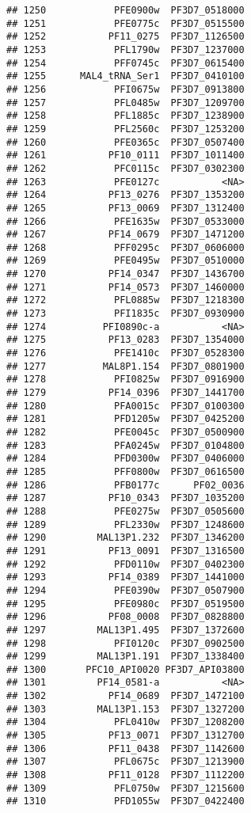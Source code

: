 \documentclass[12pt, a4paper]{article}\usepackage[]{graphicx}\usepackage[]{color}
\makeatletter
\newenvironment{kframe}{%
 \def\at@end@of@kframe{}%
 \ifinner\ifhmode%
  \def\at@end@of@kframe{\end{minipage}}%
  \begin{minipage}{\columnwidth}%
 \fi\fi%
 \def\FrameCommand##1{\hskip\@totalleftmargin \hskip-\fboxsep
 \colorbox{shadecolor}{##1}\hskip-\fboxsep
     \hskip-\linewidth \hskip-\@totalleftmargin \hskip\columnwidth}%
 \MakeFramed {\advance\hsize-\width
   \@totalleftmargin\z@ \linewidth\hsize
   \@setminipage}}%
 {\par\unskip\endMakeFramed%
 \at@end@of@kframe}
\newenvironment{knitrout}{}{} %
\makeatother
\begin{document}
\begin{knitrout}
\begin{kframe}
\begin{verbatim}
## 1250            PFE0900w  PF3D7_0518000
## 1251            PFE0775c  PF3D7_0515500
## 1252           PF11_0275  PF3D7_1126500
## 1253            PFL1790w  PF3D7_1237000
## 1254            PFF0745c  PF3D7_0615400
## 1255      MAL4_tRNA_Ser1  PF3D7_0410100
## 1256            PFI0675w  PF3D7_0913800
## 1257            PFL0485w  PF3D7_1209700
## 1258            PFL1885c  PF3D7_1238900
## 1259            PFL2560c  PF3D7_1253200
## 1260            PFE0365c  PF3D7_0507400
## 1261           PF10_0111  PF3D7_1011400
## 1262            PFC0115c  PF3D7_0302300
## 1263            PFE0127c           <NA>
## 1264           PF13_0276  PF3D7_1353200
## 1265           PF13_0069  PF3D7_1312400
## 1266            PFE1635w  PF3D7_0533000
## 1267           PF14_0679  PF3D7_1471200
## 1268            PFF0295c  PF3D7_0606000
## 1269            PFE0495w  PF3D7_0510000
## 1270           PF14_0347  PF3D7_1436700
## 1271           PF14_0573  PF3D7_1460000
## 1272            PFL0885w  PF3D7_1218300
## 1273            PFI1835c  PF3D7_0930900
## 1274          PFI0890c-a           <NA>
## 1275           PF13_0283  PF3D7_1354000
## 1276            PFE1410c  PF3D7_0528300
## 1277          MAL8P1.154  PF3D7_0801900
## 1278            PFI0825w  PF3D7_0916900
## 1279           PF14_0396  PF3D7_1441700
## 1280            PFA0015c  PF3D7_0100300
## 1281            PFD1205w  PF3D7_0425200
## 1282            PFE0045c  PF3D7_0500900
## 1283            PFA0245w  PF3D7_0104800
## 1284            PFD0300w  PF3D7_0406000
## 1285            PFF0800w  PF3D7_0616500
## 1286            PFB0177c      PF02_0036
## 1287           PF10_0343  PF3D7_1035200
## 1288            PFE0275w  PF3D7_0505600
## 1289            PFL2330w  PF3D7_1248600
## 1290         MAL13P1.232  PF3D7_1346200
## 1291           PF13_0091  PF3D7_1316500
## 1292            PFD0110w  PF3D7_0402300
## 1293           PF14_0389  PF3D7_1441000
## 1294            PFE0390w  PF3D7_0507900
## 1295            PFE0980c  PF3D7_0519500
## 1296           PF08_0008  PF3D7_0828800
## 1297         MAL13P1.495  PF3D7_1372600
## 1298            PFI0120c  PF3D7_0902500
## 1299         MAL13P1.191  PF3D7_1338400
## 1300       PFC10_API0020 PF3D7_API03800
## 1301         PF14_0581-a           <NA>
## 1302           PF14_0689  PF3D7_1472100
## 1303         MAL13P1.153  PF3D7_1327200
## 1304            PFL0410w  PF3D7_1208200
## 1305           PF13_0071  PF3D7_1312700
## 1306           PF11_0438  PF3D7_1142600
## 1307            PFL0675c  PF3D7_1213900
## 1308           PF11_0128  PF3D7_1112200
## 1309            PFL0750w  PF3D7_1215600
## 1310            PFD1055w  PF3D7_0422400

\end{verbatim}
\end{kframe}
\end{knitrout}
\end{document}
